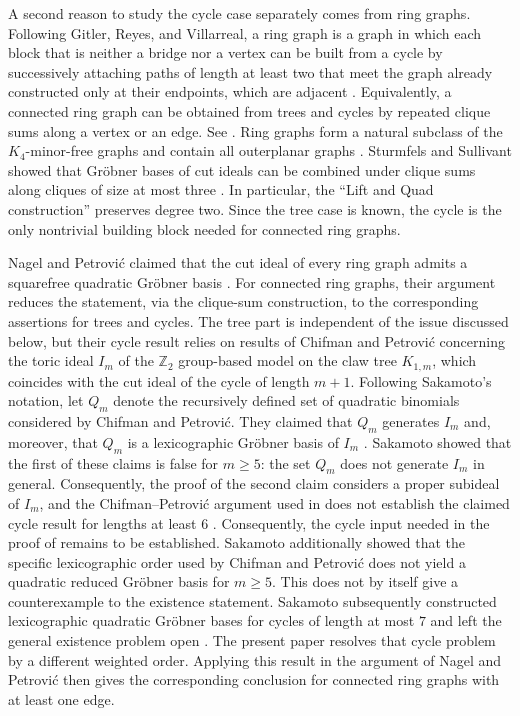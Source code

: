 \documentclass[11pt]{amsart}
\theoremstyle{definition}
\numberwithin{equation}{section}
\begin{document}
A second reason to study the cycle case separately comes from ring graphs.
Following Gitler, Reyes, and Villarreal, a ring graph is a graph
in which each block that is neither a bridge nor a vertex can be
built from a cycle by successively attaching paths of length at least
two that meet the graph already constructed only at their endpoints,
which are adjacent
\cite[Definition~2.6]{GitlerReyesVillarreal2010}.
Equivalently, a connected ring graph can be obtained from trees and cycles by repeated clique sums along a vertex or an edge.
See \cite[Definition~6.1 and the discussion following it]{NagelPetrovic2009}. 
Ring graphs form a natural subclass of the $K_4$-minor-free graphs
and contain all outerplanar graphs
\cite[Theorem~2.13 and Proposition~2.17]{GitlerReyesVillarreal2010}.
Sturmfels and Sullivant showed that Gr\"obner bases of cut ideals can be combined under clique sums along cliques of size at most three \cite[Theorem~2.1]{SturmfelsSullivant2008}. In particular, the ``Lift and Quad construction'' preserves degree two. Since the tree case is known, the cycle is the only nontrivial building block needed for connected ring graphs.

Nagel and Petrovi\'c claimed that the cut ideal of every ring graph admits a squarefree quadratic Gr\"obner basis \cite[Theorem~6.2]{NagelPetrovic2009}. 
For connected ring graphs, their argument reduces the statement,
via the clique-sum construction, to the corresponding assertions
for trees and cycles.
The tree part is independent of the issue discussed below, but their cycle result \cite[Proposition~3.2]{NagelPetrovic2009} relies on results of Chifman and Petrovi\'c concerning the toric ideal $I_m$ of the $\mathbb Z_2$ group-based model on the claw tree $K_{1,m}$, which coincides with the cut ideal of the cycle of length $m+1$. 
Following Sakamoto's notation, let $Q_m$ denote the recursively
defined set of quadratic binomials considered by Chifman and Petrovi\'c.
They claimed that $Q_m$ generates $I_m$ and, moreover, that $Q_m$
is a lexicographic Gr\"obner basis of $I_m$
\cite[Propositions~2 and~3]{ChifmanPetrovic2007}.
Sakamoto showed that the first of these claims is false for $m\ge5$: the set $Q_m$ does not generate $I_m$ in general. 
Consequently, the proof of the second claim considers a proper subideal of $I_m$, and the Chifman--Petrovi\'c argument used in \cite[Proposition~3.2]{NagelPetrovic2009} does not establish the claimed cycle result for lengths at least $6$ \cite[Section~2]{Sakamoto2021}. 
Consequently, the cycle input needed in the proof of
\cite[Theorem~6.2]{NagelPetrovic2009} remains to be established.
Sakamoto additionally showed that the specific lexicographic order used by Chifman and Petrovi\'c does not yield a quadratic reduced Gr\"obner basis for $m\ge5$. This does not by itself give a counterexample to the existence statement. Sakamoto subsequently constructed lexicographic quadratic Gr\"obner bases for cycles of length at most $7$ and left the general existence problem open \cite{Sakamoto2021}. 
The present paper resolves that cycle problem by a different weighted order.
Applying this result in the argument of Nagel and Petrovi\'c
\cite[Theorem~6.2]{NagelPetrovic2009} then gives the corresponding
conclusion for connected ring graphs with at least one edge.
\end{document}
